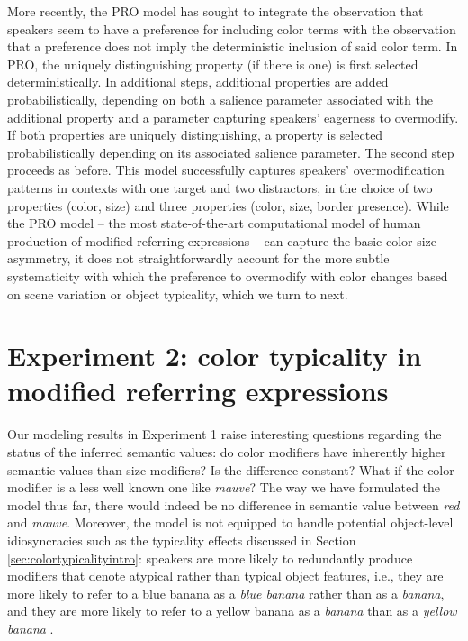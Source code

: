 \documentclass[11pt]{article}
\newcommand{\jd}[1]{\textcolor{Red}{[jd: #1]}}
\newcommand{\sectionref}[1]{Section \ref{#1}}
\begin{document}
More recently, the PRO model \cite{VanGompel2019} has sought to integrate the observation that speakers seem to have a preference for including color terms with the observation that a preference does not imply the deterministic inclusion of said color term. In PRO, the uniquely distinguishing property (if there is one) is  first selected deterministically. In additional steps, additional properties are added probabilistically, depending on both a salience parameter associated with the additional property and a parameter capturing speakers' eagerness to overmodify. If both properties are uniquely distinguishing, a property is selected probabilistically depending on its associated salience parameter. The second step proceeds as before. This model successfully captures speakers' overmodification patterns in contexts with one target and two distractors, in the choice of two properties (color, size) and three properties (color, size, border presence). 
While the PRO model -- the most state-of-the-art computational model of human production of modified referring expressions -- can capture the basic color-size asymmetry, it does not straightforwardly  account for the more subtle systematicity with which the preference to overmodify with color changes based on scene variation or object typicality, which we turn to next. 


\section[]{Experiment 2: color typicality in modified referring expressions}
\label{sec:colortypicality}

Our modeling results in Experiment 1 raise interesting questions regarding the status of the inferred semantic values: do color modifiers have inherently higher semantic values than size modifiers? Is the difference constant? What if the color modifier is a less well known one like \emph{mauve}? The way we have formulated the model thus far, there would indeed be no difference in semantic value between \emph{red} and \emph{mauve}. Moreover, the model is not equipped to handle potential object-level idiosyncracies such as the typicality effects discussed in \sectionref{sec:colortypicalityintro}: speakers are more likely to redundantly produce modifiers that denote atypical rather than typical object features, i.e., they are more likely to refer to a blue banana as a \emph{blue banana} rather than as a \emph{banana}, and they are more likely to refer to a yellow banana as a \emph{banana} than as a \emph{yellow banana} \cite{sedivy2003a, Westerbeek2015}. 
\end{document}
